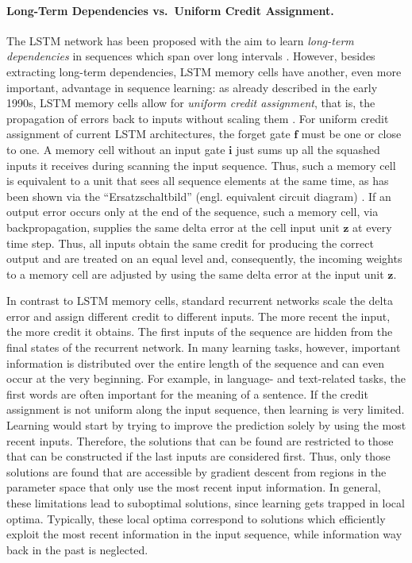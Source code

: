 \documentclass[runningheads]{llncs}
\newcommand\Bi{\bm{i}}%
\newcommand\Bf{\bm{f}}%
\newcommand\Bz{\bm{z}}%
\begin{document}
\paragraph{Long-Term Dependencies vs.\ Uniform Credit Assignment.}
The LSTM network has been proposed with the aim
to learn {\em long-term dependencies} in sequences
which span over long intervals
\cite{Arr:Hochreiter:97,Arr:Hochreiter:97e,Arr:Hochreiter:97f,Arr:Hochreiter:98}. 
However, besides extracting long-term dependencies, 
LSTM memory cells have another, even
more important, advantage in sequence learning:
as already described in the early 1990s,
LSTM memory cells allow for {\em uniform credit assignment}, that is,
the propagation of errors back to inputs without 
scaling them \cite{Arr:Hochreiter:91}. 
For uniform credit assignment of current LSTM architectures,
the forget gate $\Bf$ must be one or close to one.  
A memory cell without an input gate $\Bi$ just sums up all the squashed inputs it
receives during scanning the input sequence.
Thus, such a memory cell is equivalent to a unit that sees all sequence
elements at the same time, as has been shown via 
the ``Ersatzschaltbild'' (engl. equivalent circuit diagram) \cite{Arr:Hochreiter:91}.
If an output error occurs only at the end of the sequence,
such a memory cell, via backpropagation, supplies
the same delta error at the cell input unit $\Bz$ at every time
step.
Thus, all inputs obtain the same credit for producing the correct
output and are treated on an equal level and, consequently, the incoming weights to a memory cell 
are adjusted by using the same delta error at the input unit $\Bz$.

In contrast to LSTM memory cells, standard recurrent networks scale
the delta error and assign different credit to different inputs.
The more recent the input, the more credit it obtains.
The first inputs of the sequence are hidden from the final states of
the recurrent network.
In many learning tasks, however, important information is distributed over
the entire length of the sequence and can even occur at the very beginning. For
example, in language- and text-related tasks, 
the first words are often important for the meaning of a sentence. 
If the credit assignment is not uniform along the input sequence, then
learning is very limited. Learning would start by trying to improve
the prediction solely by using the most recent inputs.
Therefore, the solutions that can be found are restricted to those
that can be constructed if the last inputs are considered first.
Thus, only those solutions are found that are accessible by gradient
descent from regions in the parameter space that only use the most recent input information.
In general, these limitations lead to suboptimal solutions, since 
learning gets trapped in local optima. 
Typically, these local optima correspond to solutions 
which efficiently exploit the most recent information in the input
sequence, while information way back in the past is neglected.
\end{document}
